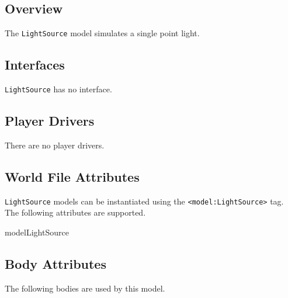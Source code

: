 

\subsection{Overview}

The {\tt LightSource} model simulates a single point light.

\subsection{\libgazebo Interfaces}

{\tt LightSource} has no \libgazebo interface.

\subsection{Player Drivers}

There are no player drivers.

\subsection{World File Attributes}

{\tt LightSource} models can be instantiated using the
\verb+<model:LightSource>+ tag.  The following attributes are
supported.

\begin{xmlattrtable}{model}{LightSource}
\modeldefaults
{}

\end{xmlattrtable}

\subsection{Body Attributes}

The following bodies are used by this model.
\begin{bodyattrtable}
\bodydefaults
\end{bodyattrtable}
